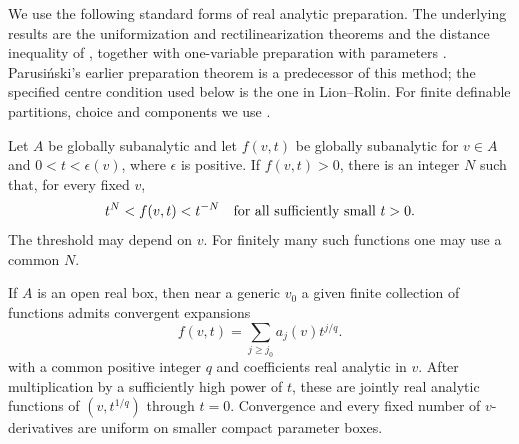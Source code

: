 We use the following standard forms of real analytic preparation. The underlying results are the uniformization and rectilinearization theorems and the distance inequality of \cite[Theorems 0.1, 0.2, and 6.4]{BierstoneMilman1988}, together with one-variable preparation with parameters \cite[Theorem 1 and Sections 0.3--0.4]{LionRolin1997}. Parusi\'nski's earlier preparation theorem \cite[Theorem~7.5]{Parusinski1994} is a predecessor of this method; the specified centre condition used below is the one in Lion--Rolin. For finite definable partitions, choice and components we use \cite[Theorems~2.10, 3.1 and~3.9]{Coste1999}.

\begin{lemma}
\label{lem:prep-puiseux}
Let $A$ be globally subanalytic and let $f(v,t)$ be globally subanalytic for $v\in A$ and $0<t<\epsilon(v)$, where $\epsilon$ is positive. If $f(v,t)>0$, there is an integer $N$ such that, for every fixed $v$,
\[
 t^N<f(v,t)<t^{-N}
 \quad\hbox{for all sufficiently small }t>0.
\]
The threshold may depend on $v$. For finitely many such functions one may use a common $N$.

If $A$ is an open real box, then near a generic $v_0$ a given finite collection of functions admits convergent expansions
\[
 f(v,t)=\sum_{j\geq j_0}a_j(v)t^{j/q}.
\]
with a common positive integer $q$ and coefficients real analytic in $v$. After multiplication by a sufficiently high power of $t$, these are jointly real analytic functions of $(v,t^{1/q})$ through $t=0$. Convergence and every fixed number of $v$-derivatives are uniform on smaller compact parameter boxes.
\end{lemma}

